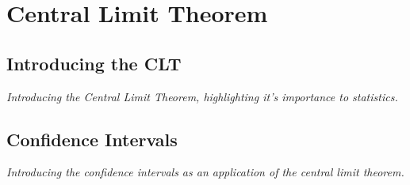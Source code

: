 
\chapter{Central Limit Theorem}



\section{Introducing the CLT}

\textit{Introducing the Central Limit Theorem, highlighting it's importance to statistics.}




\section{Confidence Intervals}

\textit{Introducing the confidence intervals as an application of the central limit theorem.}